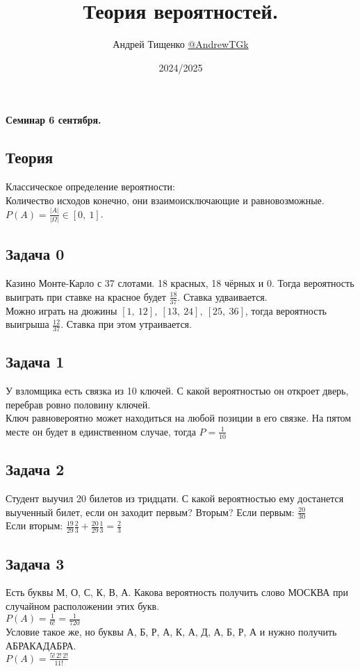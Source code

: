 \documentclass[12pt, a4paper]{article}
\title{Теория вероятностей.}
\author{Андрей Тищенко \href{https://t.me/AndrewTGk}{@AndrewTGk}}
\date{2024/2025}
\begin{document}
    \maketitle
    \begin{center}
        \textbf{Семинар 6 сентября.}
    \end{center}
    \subsection*{Теория}
    Классическое определение вероятности:\\
    Количество исходов конечно, они взаимоисключающие и равновозможные.\\
    $P(A) = \frac{|A|}{|\Omega|}\in [0,\ 1]$.
    \subsection*{Задача 0}
    Казино Монте-Карло с 37 слотами. 18 красных, 18 чёрных и 0. Тогда вероятность 
    выиграть при ставке на красное будет $\frac{18}{37}$. Ставка удваивается.\\
    Можно играть на дюжины $[1,\ 12],\ [13,\ 24],\ [25,\ 36]$, тогда вероятность 
    выигрыша $\frac{12}{37}$. Ставка при этом утраивается.
    \subsection*{Задача 1}
    У взломщика есть связка из 10 ключей. С какой вероятностью он откроет дверь, 
    перебрав ровно половину ключей.\\
    Ключ равновероятно может находиться на любой позиции в его связке. На пятом месте он 
    будет в единственном случае, тогда $P = \frac{1}{10}$
    \subsection*{Задача 2}
    Студент выучил 20 билетов из тридцати. С какой вероятностью 
    ему достанется выученный билет, если он заходит первым? Вторым?
    Если первым: $\frac{20}{30}$\\
    Если вторым: $\frac{19}{29}\frac{2}{3} + \frac{20}{29}\frac{1}{3} = \frac{2}{3}$
    \subsection*{Задача 3}
    Есть буквы М, О, С, К, В, А. Какова вероятность получить 
    слово МОСКВА при случайном расположении этих букв.\\
    $P(A) = \frac{1}{6!} = \frac{1}{720}$\\
    Условие такое же, но буквы А, Б, Р, А, К, А, Д, А, Б, Р, А и нужно получить АБРАКАДАБРА.\\
    $P(A) = \frac{5!\,2!\,2!}{11!}$
\end{document}
